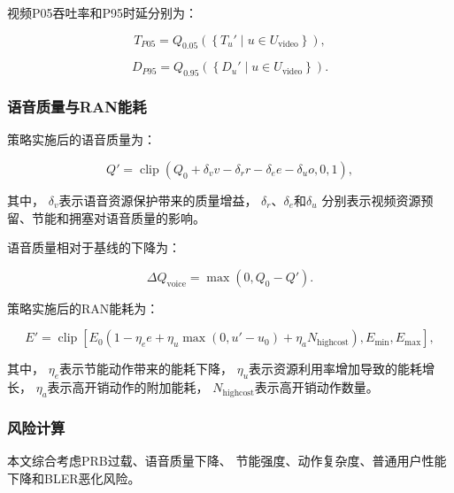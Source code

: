\documentclass[lang=cn,12pt]{elegantbook}
\begin{document}
视频P05吞吐率和P95时延分别为：

\begin{equation}
T_{P05}
=
Q_{0.05}
\left(
\left\{
T_u'
\mid
u\in U_{\mathrm{video}}
\right\}
\right),
\label{eq:video_p05_reduced}
\end{equation}

\begin{equation}
D_{P95}
=
Q_{0.95}
\left(
\left\{
D_u'
\mid
u\in U_{\mathrm{video}}
\right\}
\right).
\label{eq:video_p95_reduced}
\end{equation}


\subsubsection*{语音质量与RAN能耗}

策略实施后的语音质量为：

\begin{equation}
Q'
=
\operatorname{clip}
\left(
Q_0
+
\delta_vv
-
\delta_rr
-
\delta_ee
-
\delta_uo,
0,
1
\right),
\label{eq:voice_quality_reduced}
\end{equation}

其中，
$\delta_v$表示语音资源保护带来的质量增益，
$\delta_r$、$\delta_e$和$\delta_u$
分别表示视频资源预留、节能和拥塞对语音质量的影响。

语音质量相对于基线的下降为：

\begin{equation}
\Delta Q_{\mathrm{voice}}
=
\max
\left(
0,
Q_0-Q'
\right).
\label{eq:voice_degradation_eval_reduced}
\end{equation}

策略实施后的RAN能耗为：

\begin{equation}
E'
=
\operatorname{clip}
\left[
E_0
\left(
1-\eta_ee
+
\eta_u\max(0,u'-u_0)
+
\eta_aN_{\mathrm{highcost}}
\right),
E_{\min},
E_{\max}
\right],
\label{eq:ran_energy_reduced}
\end{equation}

其中，
$\eta_e$表示节能动作带来的能耗下降，
$\eta_u$表示资源利用率增加导致的能耗增长，
$\eta_a$表示高开销动作的附加能耗，
$N_{\mathrm{highcost}}$表示高开销动作数量。


\subsubsection*{风险计算}

本文综合考虑PRB过载、语音质量下降、
节能强度、动作复杂度、普通用户性能下降和BLER恶化风险。
\end{document}

